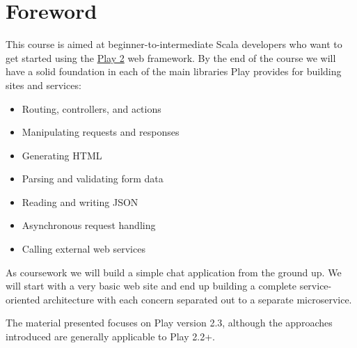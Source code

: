 
\section{Foreword}\label{foreword}

This course is aimed at beginner-to-intermediate Scala developers who
want to get started using the \href{http://playframework.com}{Play 2}  web framework. By the end of
the course we will have a solid foundation in each of the main libraries
Play provides for building sites and services:

\begin{itemize}
\itemsep1pt\parskip0pt
\item
  Routing, controllers, and actions
\item
  Manipulating requests and responses
\item
  Generating HTML
\item
  Parsing and validating form data
\item
  Reading and writing JSON
\item
  Asynchronous request handling
\item
  Calling external web services
\end{itemize}

As coursework we will build a simple chat application from the ground
up. We will start with a very basic web site and end up building a
complete service-oriented architecture with each concern separated out
to a separate microservice.

The material presented focuses on Play version 2.3, although the
approaches introduced are generally applicable to Play 2.2+.
